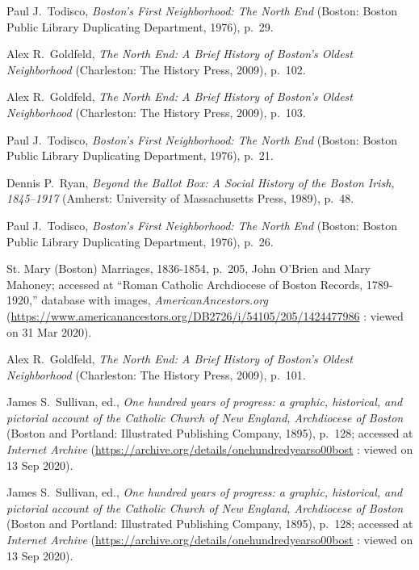 \begin{thebibliography}{999}
Paul J.\ Todisco, \textit{Boston's First Neighborhood: The North End} (Boston: Boston Public Library Duplicating Department, 1976), p.\ 29.

Alex R.\ Goldfeld, \textit{The North End: A Brief History of Boston's Oldest Neighborhood} (Charleston: The History Press, 2009), p.\ 102.

Alex R.\ Goldfeld, \textit{The North End: A Brief History of Boston's Oldest Neighborhood} (Charleston: The History Press, 2009), p.\ 103.

Paul J.\ Todisco, \textit{Boston's First Neighborhood: The North End} (Boston: Boston Public Library Duplicating Department, 1976), p.\ 21.

Dennis P.\ Ryan, \textit{Beyond the Ballot Box: A Social History of the Boston Irish, 1845--1917} (Amherst: University of Massachusetts Press, 1989), p.\ 48.

Paul J.\ Todisco, \textit{Boston's First Neighborhood: The North End} (Boston: Boston Public Library Duplicating Department, 1976), p.\ 26.

St. Mary (Boston) Marriages, 1836-1854, p.\ 205, John O'Brien and Mary Mahoney; accessed at ``Roman Catholic Archdiocese of Boston Records, 1789-1920,'' database with images, \textit{AmericanAncestors.org} (\url{https://www.americanancestors.org/DB2726/i/54105/205/1424477986} : viewed on 31 Mar 2020).

Alex R.\ Goldfeld, \textit{The North End: A Brief History of Boston's Oldest Neighborhood} (Charleston: The History Press, 2009), p.\ 101.

James S.\ Sullivan, ed., \textit{One hundred years of progress: a graphic, historical, and pictorial account of the Catholic Church of New England, Archdiocese of Boston} (Boston and Portland: Illustrated Publishing Company, 1895), p.\ 128; accessed at \textit{Internet Archive} (\url{https://archive.org/details/onehundredyearso00bost} : viewed on 13 Sep 2020).

James S.\ Sullivan, ed., \textit{One hundred years of progress: a graphic, historical, and pictorial account of the Catholic Church of New England, Archdiocese of Boston} (Boston and Portland: Illustrated Publishing Company, 1895), p.\ 128; accessed at \textit{Internet Archive} (\url{https://archive.org/details/onehundredyearso00bost} : viewed on 13 Sep 2020).


\end{thebibliography}
